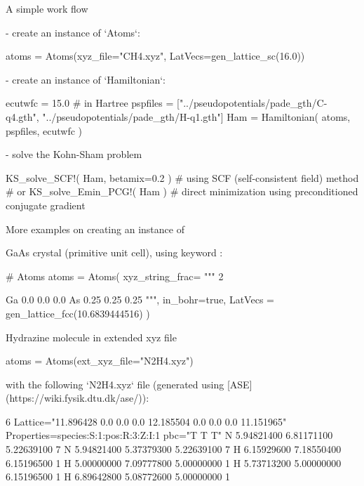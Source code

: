 A simple work flow

- create an instance of `Atoms`:

\begin{juliacode}
atoms = Atoms(xyz_file="CH4.xyz", LatVecs=gen_lattice_sc(16.0))
\end{juliacode}

- create an instance of `Hamiltonian`:

\begin{juliacode}
ecutwfc = 15.0 # in Hartree
pspfiles = ["../pseudopotentials/pade_gth/C-q4.gth",
            "../pseudopotentials/pade_gth/H-q1.gth"]
Ham = Hamiltonian( atoms, pspfiles, ecutwfc )
\end{juliacode}

- solve the Kohn-Sham problem

\begin{juliacode}
KS_solve_SCF!( Ham, betamix=0.2 )  # using SCF (self-consistent field) method
# or
KS_solve_Emin_PCG!( Ham ) # direct minimization using preconditioned conjugate gradient
\end{juliacode}

More examples on creating an instance of 

GaAs crystal (primitive unit cell), using keyword :
\begin{juliacode}
# Atoms
atoms = Atoms( xyz_string_frac=
    """
    2

    Ga  0.0   0.0   0.0
    As  0.25  0.25  0.25
    """,
    in_bohr=true,
    LatVecs = gen_lattice_fcc(10.6839444516)
)
\end{juliacode}


Hydrazine molecule in extended xyz file
\begin{juliacode}
atoms = Atoms(ext_xyz_file="N2H4.xyz")
\end{juliacode}
with the following `N2H4.xyz` file (generated using [ASE](https://wiki.fysik.dtu.dk/ase/)):
\begin{textcode}
6
Lattice="11.896428 0.0 0.0 0.0 12.185504 0.0 0.0 0.0 11.151965" Properties=species:S:1:pos:R:3:Z:I:1 pbc="T T T"
N       5.94821400       6.81171100       5.22639100        7 
N       5.94821400       5.37379300       5.22639100        7 
H       6.15929600       7.18550400       6.15196500        1 
H       5.00000000       7.09777800       5.00000000        1 
H       5.73713200       5.00000000       6.15196500        1 
H       6.89642800       5.08772600       5.00000000        1 
\end{textcode}

